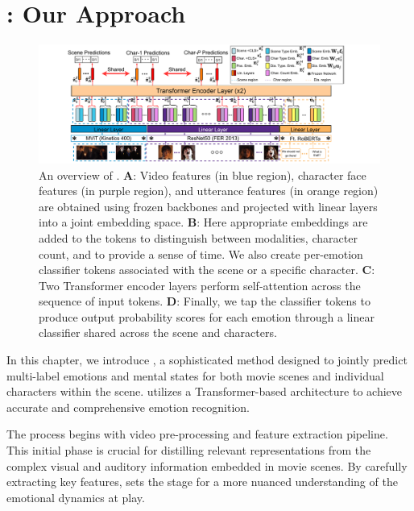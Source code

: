 \chapter{\modelname{}: Our Approach}
\label{ch:emotx}

\begin{figure}[t]
\centering
\includegraphics[width=\textwidth,height=0.33\textheight]{Figures/emotx_marked.pdf}
\vspace{-6mm}
\caption{An overview of \modelname{}.
\textbf{A}: Video features (in blue region),
character face features (in purple region), and
utterance features (in orange region)
are obtained using frozen backbones and projected with linear layers into a joint embedding space.
\textbf{B}: Here appropriate embeddings are added to the tokens to distinguish between modalities, character count, and to provide a sense of time.
We also create per-emotion classifier tokens associated with the scene or a specific character.
\textbf{C}: Two Transformer encoder layers perform self-attention across the sequence of input tokens.
\textbf{D}: Finally, we tap the classifier tokens to produce output probability scores for each emotion through a linear classifier shared across the scene and characters.}
\label{fig:model_overview}
\vspace{-3mm}
\end{figure}

In this chapter, we introduce \modelname{}, a sophisticated method designed to jointly predict multi-label emotions and mental states for both movie scenes and individual characters within the scene. \modelname{} utilizes a Transformer-based architecture to achieve accurate and comprehensive emotion recognition.

The process begins with video pre-processing and feature extraction pipeline. This initial phase is crucial for distilling relevant representations from the complex visual and auditory information embedded in movie scenes. By carefully extracting key features, \modelname{} sets the stage for a more nuanced understanding of the emotional dynamics at play.

